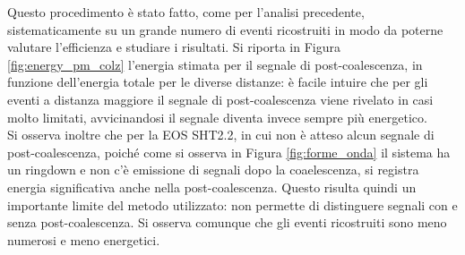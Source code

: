 Questo procedimento è stato fatto, come per l'analisi precedente, sistematicamente su un grande numero di eventi ricostruiti in modo da poterne valutare l'efficienza e studiare i risultati. Si riporta in Figura \ref{fig:energy_pm_colz} l'energia stimata per il segnale di post-coalescenza, in funzione dell'energia totale per le diverse distanze: è facile intuire che per gli eventi a distanza maggiore il segnale di post-coalescenza viene rivelato in casi molto limitati, avvicinandosi il segnale diventa invece sempre più energetico. \\
Si osserva inoltre che per la EOS SHT2.2, in cui non è atteso alcun segnale di post-coalescenza, poiché come si osserva in Figura \ref{fig:forme_onda} il sistema ha un ringdown e non c'è emissione di segnali dopo la coaelescenza, si registra energia significativa anche nella post-coalescenza. Questo risulta quindi un importante limite del metodo utilizzato: non permette di distinguere segnali con e senza post-coalescenza. Si osserva comunque che gli eventi ricostruiti sono meno numerosi e meno energetici.
